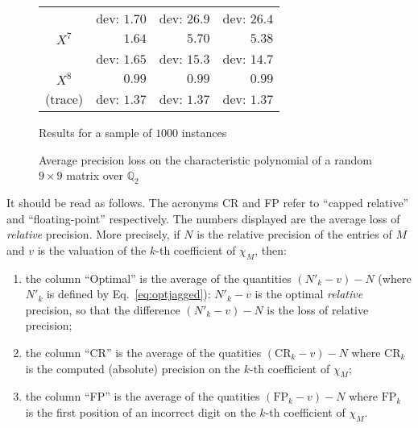 \documentclass[sigconf]{acmart}
\newcommand{\Q}{\mathbb Q}
\theoremstyle{definition}
\begin{document}
\begin{figure}
{\begin{tabular}{|c|r|r|r|}
& {\scriptsize dev: $1.70$} & {\scriptsize dev: $26.9$} & {\scriptsize dev: $26.4$} \\
\rule{0pt}{2.7ex}%
$X^7$ & $1.64$ &   $5.70$           &   $5.38$ \vspace{-1.5ex} \\
& {\scriptsize dev: $1.65$} & {\scriptsize dev: $15.3$} & {\scriptsize dev: $14.7$} \\
\rule{0pt}{2.7ex}%
$X^8$ & $0.99$ &   $0.99$           &   $0.99$ \vspace{-1.5ex} \\
{\scriptsize (trace)} 
& {\scriptsize dev: $1.37$} & {\scriptsize dev: $1.37$} & {\scriptsize dev: $1.37$} \\
\hline
\end{tabular}}
\hfill\null

\medskip

\hfill
{\footnotesize Results for a sample of $1000$ instances}
\hfill\null

\caption{Average precision loss on 
the characteristic polynomial of a random $9 \times 9$
matrix over $\Q_2$}
\label{fig:exp}

\end{figure}
%
It should be read as follows. The acronyms CR and FP 
refer to ``capped relative'' and ``floating-point'' respectively.
The numbers displayed are the average loss of
\emph{relative} precision. 
More precisely, if $N$ is the relative precision of
the entries of $M$ and $v$ is the valuation of
the $k$-th coefficient of $\chi_M$, then:

\vspace{-2mm}

\begin{enumerate}[$\bullet$]
\renewcommand{\itemsep}{0pt}
\item the column ``Optimal'' is the average of the quantities 
$(N'_k{-}v) - N$ (where $N'_k$ is defined by Eq.~\eqref{eq:optjagged}): 
$N'_k{-}v$ is the optimal \emph{relative} precision, so that the
difference $(N'_k{-}v) - N$ is the loss of relative precision;
\item the column ``CR'' is the average of the quatities 
$(\text{CR}_k{-}v) - N$ where $\text{CR}_k$ is the computed (absolute) 
precision on the $k$-th coefficient of $\chi_M$;
\item the column ``FP'' is the average of the quatities 
$(\text{FP}_k{-}v) - N$ where $\text{FP}_k$ is the first position of
an incorrect digit on the $k$-th coefficient of $\chi_M$.
\end{enumerate}
\end{document}
